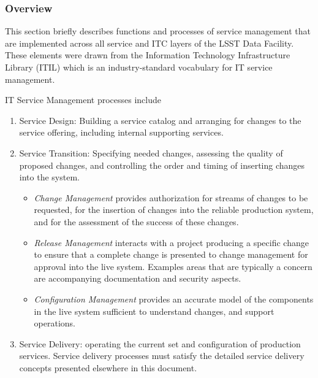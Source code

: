 \subsubsection{Overview}
This section briefly describes functions and processes of service
management that are implemented across all service and ITC layers of
the LSST Data Facility. These elements were drawn from the Information
Technology Infrastructure Library (ITIL) which is an industry-standard
vocabulary for IT service management.

IT Service Management processes include

\begin{enumerate}

\item Service Design: Building a service catalog and arranging for changes to the service offering, including internal supporting services.

\item Service Transition: Specifying needed changes, assessing the quality of proposed changes,
and controlling the order and timing of inserting changes into the system.

  \begin{itemize}
 
  \item \emph{Change Management} provides authorization for streams of changes to be requested, for the insertion of changes into the reliable production system, and for the assessment of the success of these changes.

  \item \emph{Release Management} interacts with a project producing a specific change to ensure that
a complete change is presented to change management for approval into the live system. Examples areas that are typically a concern are accompanying documentation and security aspects.

  \item \emph{Configuration Management} provides an accurate model of the components in the live system sufficient to understand changes, and support operations.
 
  \end{itemize}

\item Service Delivery: operating the current set and configuration of production services. Service delivery processes must satisfy the detailed service delivery concepts presented elsewhere in this document.

  \begin{itemize}
  

\end{itemize}
\end{enumerate}
